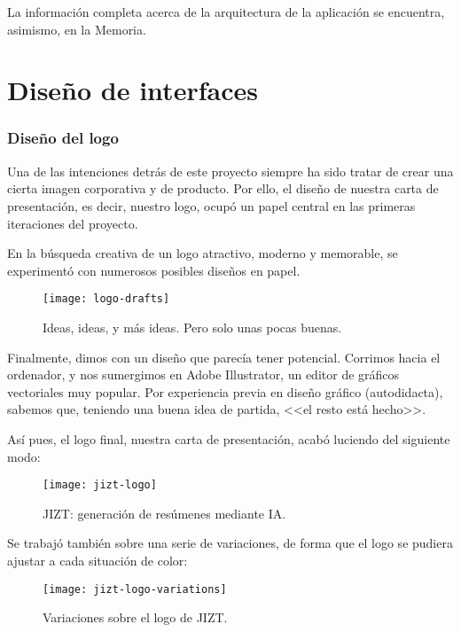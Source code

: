 La información completa acerca de la arquitectura de la aplicación se encuentra, asimismo, en la Memoria.


\section{Diseño de interfaces}

\subsubsection{Diseño del logo}

Una de las intenciones detrás de este proyecto siempre ha sido tratar de crear una cierta imagen corporativa y de producto. Por ello, el diseño de nuestra carta de presentación, es decir, nuestro logo, ocupó un papel central en las primeras iteraciones del proyecto.

En la búsqueda creativa de un logo atractivo, moderno y memorable, se experimentó con numerosos posibles diseños en papel.

\begin{figure}[h!]
	\centering
	\texttt{[image: logo-drafts]}
	\vspace{-0.5cm}
	\caption{Ideas, ideas, y más ideas. Pero solo unas pocas buenas.}
\end{figure}

Finalmente, dimos con un diseño que parecía tener potencial. Corrimos hacia el ordenador, y nos sumergimos en Adobe Illustrator, un editor de gráficos vectoriales muy popular. Por experiencia previa en diseño gráfico (autodidacta), sabemos que, teniendo una buena idea de partida, <<el resto está hecho>>.

Así pues, el logo final, nuestra carta de presentación, acabó luciendo del siguiente modo:

\begin{figure}[h!]
	\centering
	\texttt{[image: jizt-logo]}
	\vspace{-0.5cm}
	\caption{JIZT: generación de resúmenes mediante IA.}
\end{figure}

Se trabajó también sobre una serie de variaciones, de forma que el logo se pudiera ajustar a cada situación de color:

\begin{figure}[h!]
	\centering
	\texttt{[image: jizt-logo-variations]}
	\vspace{-0.5cm}
	\caption{Variaciones sobre el logo de JIZT.}
\end{figure}

